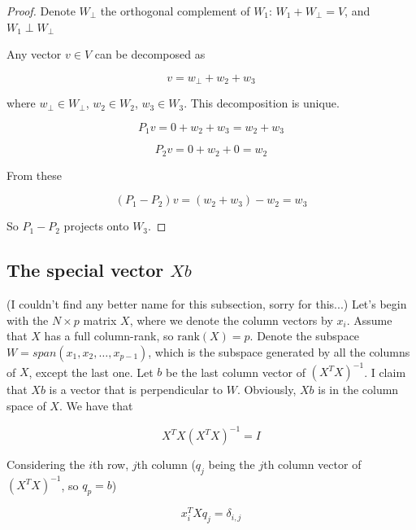 \documentclass{article}
\begin{document}
\begin{appendices}
\begin{proof}
Denote $W_{\perp}$ the orthogonal complement of $W_1$: $W_1 + W_{\perp} = V$, and $W_1 \perp W_{\perp}$

Any vector $v \in V$ can be decomposed as

\begin{equation}
    v = w_{\perp} + w_2 + w_3
\end{equation}

where $w_{\perp} \in W_{\perp}$, $w_2 \in W_2$, $w_3 \in W_3$. This decomposition is unique.

\begin{equation}
    P_1 v = 0 + w_2 + w_3 = w_2 + w_3
\end{equation}

\begin{equation}
    P_2 v = 0 + w_2 + 0 = w_2
\end{equation}

From these

\begin{equation}
    (P_1 - P_2) v = (w_2 + w_3) - w_2 = w_3
\end{equation}

So $P_1 - P_2$ projects onto $W_3$.

\end{proof}

\subsection{The special vector $Xb$} \label{app:spec_Xb}

(I couldn't find any better name for this subsection, sorry for this...) Let's begin with the $N\times p$ matrix $X$, where we denote the column vectors by $x_i$. Assume that $X$ has a full column-rank, so $\text{rank}(X)=p$. Denote the subspace $W = span(x_1, x_2, \dots, x_{p-1})$, which is the subspace generated by all the columns of $X$, except the last one. Let $b$ be the last column vector of $(X^TX)^{-1}$. I claim that $Xb$ is a vector that is perpendicular to $W$. Obviously, $Xb$ is in the column space of $X$. We have that

\begin{equation}
    X^TX(X^TX)^{-1} = I
\end{equation}

Considering the $i$th row, $j$th column ($q_j$ being the $j$th column vector of $(X^TX)^{-1}$, so $q_p = b$)

\begin{equation}
    x^T_i X q_j = \delta_{i,j}
\end{equation}


\end{appendices}
\end{document}
